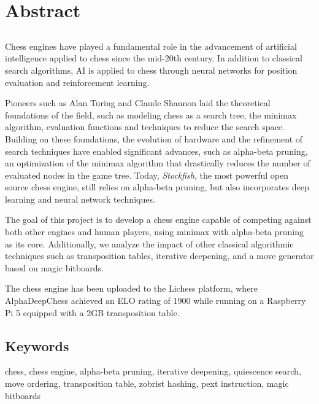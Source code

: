 \chapter*{Abstract}

\section*{\tituloPortadaEngVal}

Chess engines have played a fundamental role in the advancement of artificial intelligence applied to chess since the mid-20th century. In addition to classical search algorithms, AI is applied to chess through neural networks for position evaluation and reinforcement learning.

\vspace{1em}

\noindent Pioneers such as Alan Turing and Claude Shannon laid the theoretical foundations of the field, such as modeling chess as a search tree, the minimax algorithm, evaluation functions and techniques to reduce the search space. Building on these foundations, the evolution of hardware and the refinement of search techniques have enabled significant advances, such as alpha-beta pruning, an optimization of the minimax algorithm that drastically reduces the number of evaluated nodes in the game tree. Today, \textit{Stockfish}, the most powerful open source chess engine, still relies on alpha-beta pruning, but also incorporates deep learning and neural network techniques.

\vspace{1em}

\noindent The goal of this project is to develop a chess engine capable of competing against both other engines and human players, using minimax with alpha-beta pruning as its core. Additionally, we analyze the impact of other classical algorithmic techniques such as transposition tables, iterative deepening, and a move generator based on magic bitboards.

\vspace{1em}

The chess engine has been uploaded to the Lichess platform, where AlphaDeepChess achieved an ELO rating of 1900 while running on a Raspberry Pi 5 equipped with a 2GB transposition table.

\section*{Keywords}

\noindent chess, chess engine, alpha-beta pruning, iterative deepening, quiescence search, move ordering, transposition table, zobrist hashing, pext instruction, magic bitboards
